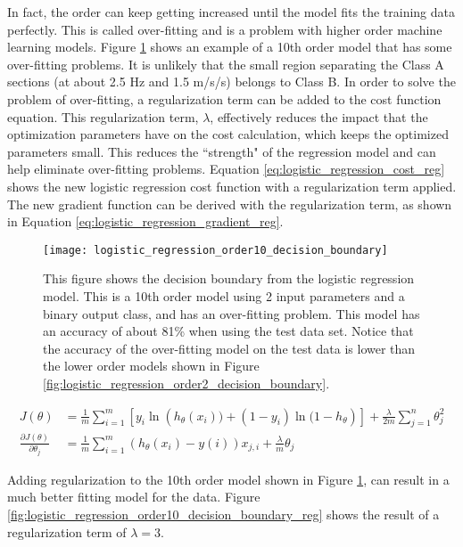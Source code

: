 In fact, the order can keep getting increased until the model fits the training data perfectly.  This is called over-fitting and is a problem with higher order machine learning models.  Figure \ref{fig:logistic_regression_order10_decision_boundary} shows an example of a 10th order model that has some over-fitting problems.  It is unlikely that the small region separating the Class A sections (at about 2.5 Hz and 1.5 m/s/s) belongs to Class B.  In order to solve the problem of over-fitting, a regularization term can be added to the cost function equation.  This regularization term, $\lambda$, effectively reduces the impact that the optimization parameters have on the cost calculation, which keeps the optimized parameters small.  This reduces the ``strength" of the regression model and can help eliminate over-fitting problems.  Equation \ref{eq:logistic_regression_cost_reg} shows the new logistic regression cost function with a regularization term applied.  The new gradient function can be derived with the regularization term, as shown in Equation \ref{eq:logistic_regression_gradient_reg}.

\begin{figure}
	\centering
	\texttt{[image: logistic\_regression\_order10\_decision\_boundary]}
	\decoRule
	\caption{This figure shows the decision boundary from the logistic regression model.  This is a 10th order model using 2 input parameters and a binary output class, and has an over-fitting problem.  This model has an accuracy of about 81\% when using the test data set.  Notice that the accuracy of the over-fitting model on the test data is lower than the lower order models shown in Figure \ref{fig:logistic_regression_order2_decision_boundary}.}
	\label{fig:logistic_regression_order10_decision_boundary}
\end{figure}

\begin{align}
	J(\theta) &= \frac{1}{m} \sum_{i=1}^{m}{\left[y_i \ln({h_{\theta}(x_i))} + (1-y_i) \ln{(1-h_{\theta}}) \right]} + \frac{\lambda}{2m} \sum_{j=1}^{n}{\theta_j^2} \label{eq:logistic_regression_cost_reg} \\	
	\frac{\partial J(\theta)}{\partial \theta_j} &= \frac{1}{m} \sum_{i=1}^{m}{\left(h_{\theta}(x_i) - y(i)\right) x_{j,i}} + \frac{\lambda}{m} \theta_j\label{eq:logistic_regression_gradient_reg}
\end{align}

Adding regularization to the 10th order model shown in Figure \ref{fig:logistic_regression_order10_decision_boundary}, can result in a much better fitting model for the data.  Figure \ref{fig:logistic_regression_order10_decision_boundary_reg} shows the result of a regularization term of $\lambda=3$.

